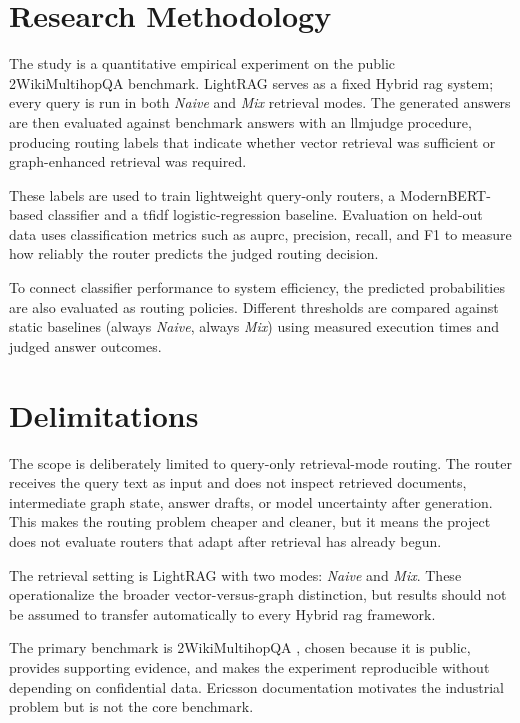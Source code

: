 \documentclass[english, bibtex]{kththesis}               %
\numberwithin{listing}{chapter}
\begin{document}
\section{Research Methodology}
\label{sec:researchMethodology}

The study is a quantitative empirical experiment on the public 2WikiMultihopQA benchmark. LightRAG serves as a fixed Hybrid \gls{rag} system; every query is run in both \emph{Naive} and \emph{Mix} retrieval modes. The generated answers are then evaluated against benchmark answers with an \gls{llmjudge} procedure, producing routing labels that indicate whether vector retrieval was sufficient or graph-enhanced retrieval was required.

These labels are used to train lightweight query-only routers, a ModernBERT-based classifier and a \gls{tfidf} logistic-regression baseline. Evaluation on held-out data uses classification metrics such as \gls{auprc}, precision, recall, and F1 to measure how reliably the router predicts the judged routing decision.

To connect classifier performance to system efficiency, the predicted probabilities are also evaluated as routing policies. Different thresholds are compared against static baselines (always \emph{Naive}, always \emph{Mix}) using measured execution times and judged answer outcomes.

\section{Delimitations}
\label{sec:delimitations}

The scope is deliberately limited to query-only retrieval-mode routing. The router receives the query text as input and does not inspect retrieved documents, intermediate graph state, answer drafts, or model uncertainty after generation. This makes the routing problem cheaper and cleaner, but it means the project does not evaluate routers that adapt after retrieval has already begun.

The retrieval setting is LightRAG with two modes: \emph{Naive} and \emph{Mix}. These operationalize the broader vector-versus-graph distinction, but results should not be assumed to transfer automatically to every Hybrid \gls{rag} framework.

The primary benchmark is 2WikiMultihopQA \cite{ho2020twowiki}, chosen because it is public, provides supporting evidence, and makes the experiment reproducible without depending on confidential data. Ericsson documentation motivates the industrial problem but is not the core benchmark.
\end{document}
